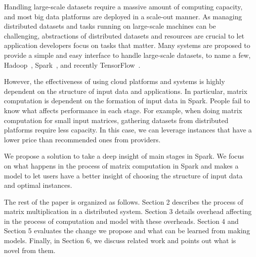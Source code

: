 \documentclass[10pt, conference, compsocconf]{IEEEtran}
\begin{document}
Handling large-scale datasets require a massive amount of computing capacity, and most big data platforms are deployed in a scale-out manner. As managing distributed datasets and tasks running on large-scale machines can be challenging, abstractions of distributed datasets and resources are crucial to let application developers focus on tasks that matter. Many systems are proposed to provide a simple and easy interface to handle large-scale datasets, to name a few, Hadoop~\cite{hadoop}, Spark~\cite{spark}, and recently TensorFlow~\cite{tensorflow}.

However, the effectiveness of using cloud platforms and systems is highly dependent on the structure of input data and applications. In particular, matrix computation is dependent on the formation of input data in Spark. People fail to know what affects performance in each stage. For example, when doing matrix computation for small input matrices, gathering datasets from distributed platforms require less capacity. In this case, we can leverage instances that have a lower price than recommended ones from providers. 

We propose a solution to take a deep insight of main stages in Spark. We focus on what happens in the process of matrix computation in Spark and makes a model to let users have a better insight of choosing the structure of input data and optimal instances. 

The rest of the paper is organized as follows. Section 2 describes the process of matrix multiplication in a distributed system. Section 3 details overhead affecting in the process of computation and model with these overheads. Section 4 and Section 5 evaluates the change we propose and what can be learned from making models. Finally, in Section 6, we discuss related work and points out what is novel from them.
\end{document}
